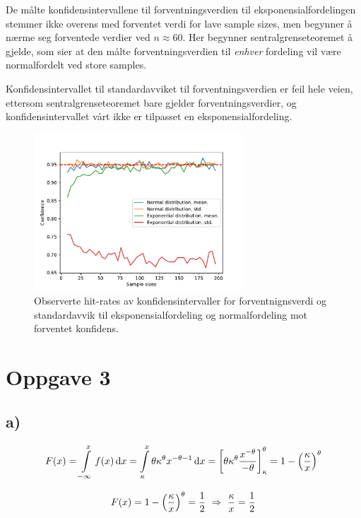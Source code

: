 \documentclass[12p,a4paper]{article}
\newcommand{\half}{\frac{1}{2}}
\begin{document}
De målte konfidensintervallene til forventningsverdien til eksponensialfordelingen stemmer ikke overens med forventet verdi for lave sample sizes, men begynner å nærme seg forventede verdier ved $n \approx 60$. Her begynner sentralgrenseteoremet å gjelde, som sier at den målte forventningsverdien til \textit{enhver} fordeling vil være normalfordelt ved store samples.

Konfidensintervallet til standardavviket til forventningsverdien er feil hele veien, ettersom sentralgrenseteoremet bare gjelder forventningsverdier, og konfidensintervallet vårt ikke er tilpasset en eksponensialfordeling.

\begin{figure}
    \centering
    \includegraphics[width=0.7\textwidth]{opg2.pdf}
    \caption{Observerte hit-rates av konfidensintervaller for forventnignsverdi og standardavvik til eksponensialfordeling og normalfordeling mot forventet konfidens.}
    \label{fig:1}
\end{figure}



\section*{Oppgave 3}
\subsection*{a)}
\begin{equation*}
    F(x) = \int\limits_{-\infty}^x f(x) \dd{x} = \int\limits_{\kappa}^x \theta\kappa^\theta x^{-\theta-1} \dd{x} = \qty[\theta\kappa^\theta\frac{x^{-\theta}}{-\theta}]_\kappa^\theta = 1 - \qty(\frac{\kappa}{x})^\theta
\end{equation*}

\begin{equation*}
    F(x) = 1 - \qty(\frac{\kappa}{x})^\theta = \half \ \Rightarrow \ \frac{\kappa}{x} = \frac{1}{2}
\end{equation*}
\end{document}
